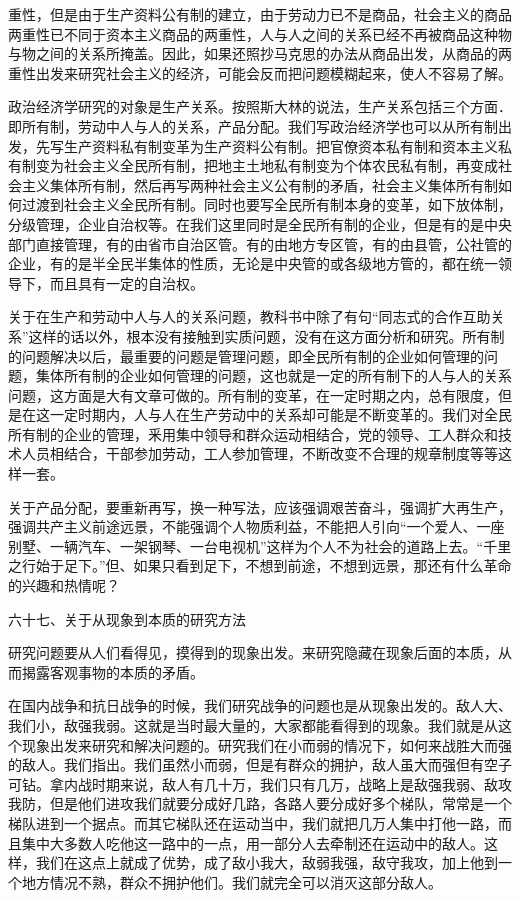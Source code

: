 重性，但是由于生产资料公有制的建立，由于劳动力已不是商品，社会主义的商品两重性已不同于资本主义商品的两重性，人与人之间的关系已经不再被商品这种物与物之间的关系所掩盖。因此，如果还照抄马克思的办法从商品出发，从商品的两重性出发来研究社会主义的经济，可能会反而把问题模糊起来，使人不容易了解。

政治经济学研究的对象是生产关系。按照斯大林的说法，生产关系包括三个方面．即所有制，劳动中人与人的关系，产品分配。我们写政治经济学也可以从所有制出发，先写生产资料私有制变革为生产资料公有制。把官僚资本私有制和资本主义私有制变为社会主义全民所有制，把地主土地私有制变为个体农民私有制，再变成社会主义集体所有制，然后再写两种社会主义公有制的矛盾，社会主义集体所有制如何过渡到社会主义全民所有制。同时也要写全民所有制本身的变革，如下放体制，分级管理，企业自治权等。在我们这里同时是全民所有制的企业，但是有的是中央部门直接管理，有的由省市自治区管。有的由地方专区管，有的由县管，公社管的企业，有的是半全民半集体的性质，无论是中央管的或各级地方管的，都在统一领导下，而且具有一定的自治权。

关于在生产和劳动中人与人的关系问题，教科书中除了有句“同志式的合作互助关系”这样的话以外，根本没有接触到实质问题，没有在这方面分析和研究。所有制的问题解决以后，最重要的问题是管理问题，即全民所有制的企业如何管理的问题，集体所有制的企业如何管理的问题，这也就是一定的所有制下的人与人的关系问题，这方面是大有文章可做的。所有制的变革，在一定时期之内，总有限度，但是在这一定时期内，人与人在生产劳动中的关系却可能是不断变革的。我们对全民所有制的企业的管理，釆用集中领导和群众运动相结合，党的领导、工人群众和技术人员相结合，干部参加劳动，工人参加管理，不断改变不合理的规章制度等等这样一套。

关于产品分配，要重新再写，换一种写法，应该强调艰苦奋斗，强调扩大再生产，强调共产主义前途远景，不能强调个人物质利益，不能把人引向“一个爱人、一座别墅、一辆汽车、一架钢琴、一台电视机”这样为个人不为社会的道路上去。“千里之行始于足下。”但、如果只看到足下，不想到前途，不想到远景，那还有什么革命的兴趣和热情呢？

六十七、关于从现象到本质的研究方法

研究问题要从人们看得见，摸得到的现象出发。来研究隐藏在现象后面的本质，从而揭露客观事物的本质的矛盾。

在国内战争和抗日战争的时候，我们研究战争的问题也是从现象出发的。敌人大、我们小，敌强我弱。这就是当时最大量的，大家都能看得到的现象。我们就是从这个现象出发来研究和解决问题的。研究我们在小而弱的情况下，如何来战胜大而强的敌人。我们指出。我们虽然小而弱，但是有群众的拥护，敌人虽大而强但有空子可钻。拿内战时期来说，敌人有几十万，我们只有几万，战略上是敌强我弱、敌攻我防，但是他们进攻我们就要分成好几路，各路人要分成好多个梯队，常常是一个梯队进到一个据点。而其它梯队还在运动当中，我们就把几万人集中打他一路，而且集中大多数人吃他这一路中的一点，用一部分人去牵制还在运动中的敌人。这样，我们在这点上就成了优势，成了敌小我大，敌弱我强，敌守我攻，加上他到一个地方情况不熟，群众不拥护他们。我们就完全可以消灭这部分敌人。

